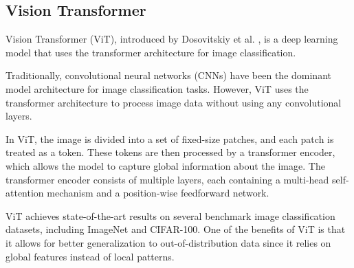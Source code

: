 \subsection{Vision Transformer}
Vision Transformer (ViT), introduced by Dosovitskiy et al.  \cite{DBLP:journals/corr/abs-2010-11929}, is a deep learning model that uses the transformer architecture for image classification. 

Traditionally, convolutional neural networks (CNNs) have been the dominant model architecture for image classification tasks. However, ViT uses the transformer architecture to process image data without using any convolutional layers.

In ViT, the image is divided into a set of fixed-size patches, and each patch is treated as a token. These tokens are then processed by a transformer encoder, which allows the model to capture global information about the image. The transformer encoder consists of multiple layers, each containing a multi-head self-attention mechanism and a position-wise feedforward network.

ViT achieves state-of-the-art results on several benchmark image classification datasets, including ImageNet and CIFAR-100. One of the benefits of ViT is that it allows for better generalization to out-of-distribution data since it relies on global features instead of local patterns.